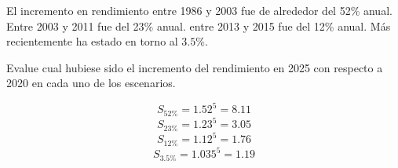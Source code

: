 \begin{acexercise}\end{acexercise}

El incremento en rendimiento entre 1986 y 2003 fue de alrededor del 52\% anual.
Entre 2003 y 2011 fue del 23\% anual.
entre 2013 y 2015 fue del 12\% anual.
Más recientemente ha estado en torno al $3.5$\%.

Evalue cual hubiese sido el incremento del rendimiento en 2025 con respecto
a 2020 en cada uno de los escenarios.

\begin{acsolution}\end{acsolution}

\[S_{52\%} = 1.52^5 = 8.11\]
\[S_{23\%} = 1.23^5 = 3.05\]
\[S_{12\%} = 1.12^5 = 1.76\]
\[S_{3.5\%} = 1.035^5 = 1.19\]

